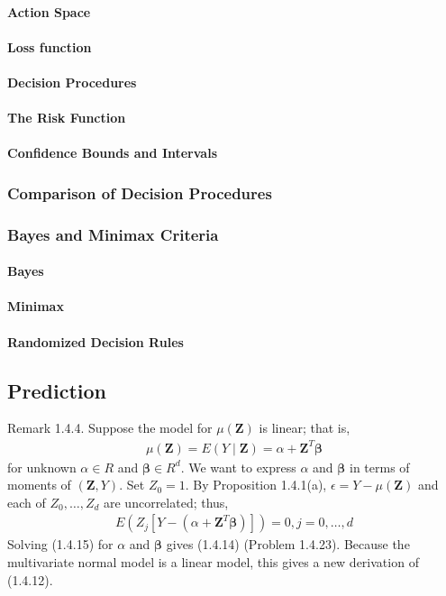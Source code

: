 \documentclass{article}
\begin{document}
\paragraph{Action Space}
\paragraph{Loss function}
\paragraph{Decision Procedures}
\paragraph{The Risk Function}
\paragraph{Confidence Bounds and Intervals}
\subsubsection{Comparison of Decision Procedures}
\subsubsection{Bayes and Minimax Criteria}
\paragraph{Bayes}
\paragraph{Minimax}
\paragraph{Randomized Decision Rules}

\subsection{Prediction}
Remark 1.4.4. Suppose the model for $\mu(\mathbf{Z})$ is linear; that is,
\begin{align*}
\mu(\mathbf{Z})=E(Y \mid \mathbf{Z})=\alpha+\mathbf{Z}^{T} \boldsymbol{\beta}
\end{align*}
for unknown $\alpha \in R$ and $\boldsymbol{\beta} \in R^{d}$. We want to express $\alpha$ and $\boldsymbol{\beta}$ in terms of moments of $(\mathbf{Z}, Y)$. Set $Z_{0}=1$. By Proposition 1.4.1(a), $\epsilon=Y-\mu(\mathbf{Z})$ and each of $Z_{0}, \ldots, Z_{d}$ are uncorrelated; thus,
\begin{align*}
E\left(Z_{j}\left[Y-\left(\alpha+\mathbf{Z}^{T} \boldsymbol{\beta}\right)\right]\right)=0, j=0, \ldots, d
\end{align*}
Solving (1.4.15) for $\alpha$ and $\boldsymbol{\beta}$ gives (1.4.14) (Problem 1.4.23). Because the multivariate normal model is a linear model, this gives a new derivation of (1.4.12).
\end{document}
